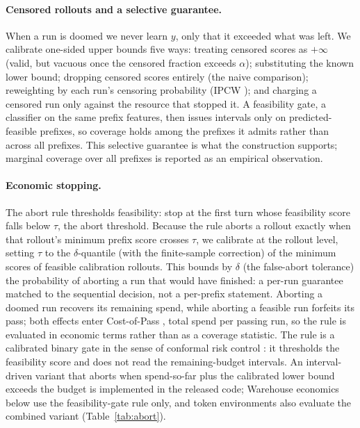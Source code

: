 \documentclass{article}
\begin{document}
\paragraph{Censored rollouts and a selective guarantee.} When a run is doomed we never
learn $y$, only that it exceeded what was left. We calibrate one-sided upper bounds
five ways: treating censored scores as $+\infty$ (valid, but vacuous once the censored
fraction exceeds $\alpha$); substituting the known lower bound; dropping censored
scores entirely (the naive comparison); reweighting by each run's censoring probability
(IPCW \cite{gui2024survival,robins1992ipcw}); and charging a censored run only against
the resource that stopped it. A feasibility gate, a classifier on the same prefix
features, then issues intervals only on predicted-feasible prefixes, so coverage holds
among the prefixes it admits rather than across all prefixes. This selective guarantee
is what the construction supports; marginal coverage over all prefixes is reported as
an empirical observation.

\paragraph{Economic stopping.} The abort rule thresholds feasibility: stop at the first
turn whose feasibility score falls below $\tau$, the abort threshold. Because the rule
aborts a rollout exactly when that rollout's minimum prefix score crosses $\tau$, we
calibrate at the rollout level, setting $\tau$ to the $\delta$-quantile (with the
finite-sample correction) of the minimum scores of feasible calibration rollouts. This
bounds by $\delta$ (the false-abort tolerance) the probability of aborting a run that
would have finished: a per-run guarantee matched to the sequential decision, not a
per-prefix statement. Aborting a doomed run recovers its remaining spend, while
aborting a feasible run forfeits its pass; both effects enter Cost-of-Pass
\cite{erol2026costofpass}, total spend per passing run, so the rule is evaluated in
economic terms rather than as a coverage statistic. The rule is a calibrated binary
gate in the sense of conformal risk control \cite{angelopoulos2024risk}: it thresholds
the feasibility score and does not read the remaining-budget intervals. An
interval-driven variant that aborts when spend-so-far plus the calibrated lower bound
exceeds the budget is implemented in the released code; Warehouse economics below use
the feasibility-gate rule only, and token environments also evaluate the combined
variant (Table~\ref{tab:abort}).
\end{document}
